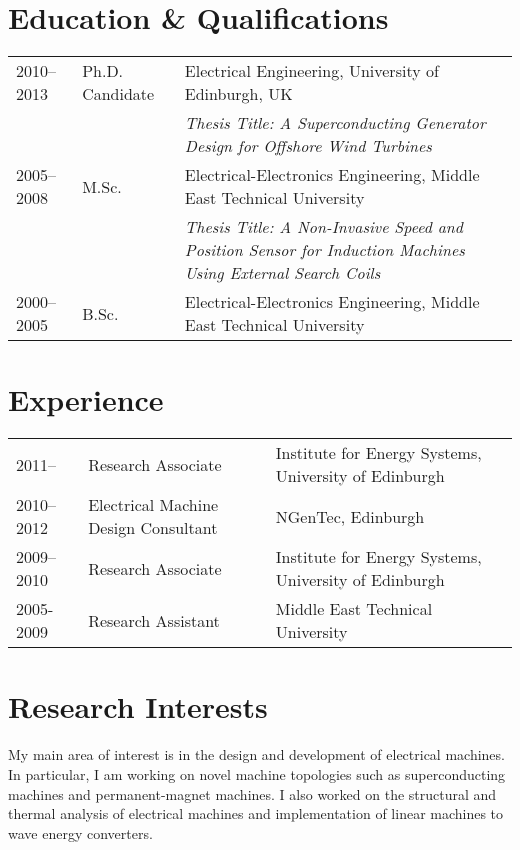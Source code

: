 \documentclass[a4paper,12pt]{article}
\begin{document}
\maketitle
 
\section{Education \& Qualifications}
\begin{tabular}{llp{12cm}}
 2010--2013 & Ph.D. Candidate & Electrical Engineering, University of Edinburgh, UK\\  
& & \textit{Thesis Title: A Superconducting Generator Design for Offshore Wind Turbines} \\ 
 2005--2008 & M.Sc. & Electrical-Electronics Engineering, Middle East Technical University \\
& & \textit{Thesis Title: A Non-Invasive Speed and Position Sensor for Induction Machines Using External Search Coils}\\
 2000--2005 & B.Sc. & Electrical-Electronics Engineering, Middle East Technical University \\

\end{tabular}

\section{Experience}

\begin{tabular}{lp{3.6cm}l}
2011-- & Research Associate & Institute for Energy Systems, University of Edinburgh \\ 
2010--2012 & Electrical Machine Design Consultant & NGenTec, Edinburgh\\
2009--2010 & Research Associate & Institute for Energy Systems, University of Edinburgh\\
2005-2009 & Research Assistant & Middle East Technical University\\ 
\end{tabular}


\section{Research Interests}

My main area of interest is in the design and development of electrical machines. In particular, I am working on novel machine topologies such as superconducting machines and permanent-magnet machines. I also worked on the structural and thermal analysis of electrical machines and implementation of linear machines to wave energy converters.
\end{document}

